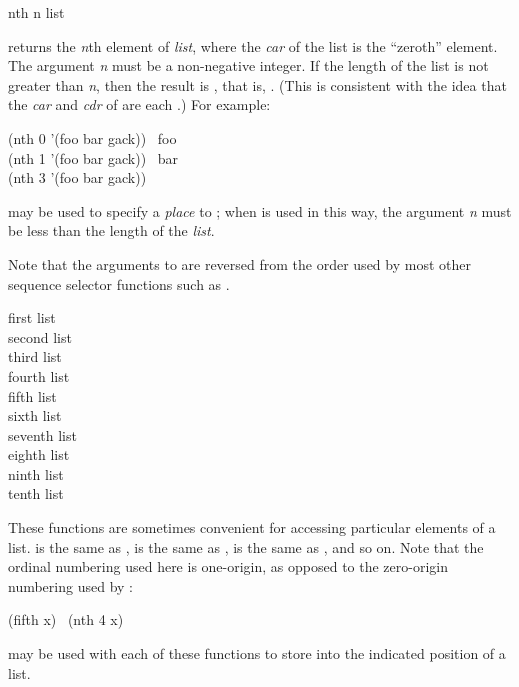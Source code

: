 \begin{defun}[Function]
nth n list

 returns the \emph{n}th element of \emph{list}, where
the \emph{car} of the list is the ``zeroth'' element.
The argument \emph{n} must be a non-negative integer.
If the length of the list is not greater than \emph{n}, then the result
is {\emptylist}, that is, {\false}.
(This is consistent with the idea that the \emph{car} and \emph{cdr}
of {\emptylist} are each {\emptylist}.)
For example:
\begin{lisp}
(nth 0 '(foo bar gack)) \EV\ foo \\
(nth 1 '(foo bar gack)) \EV\ bar \\
(nth 3 '(foo bar gack)) \EV\ {\emptylist}
\end{lisp}

 may be used to specify a \emph{place} to ;
when  is used in this way, the argument \emph{n} must be less
than the length of the \emph{list}.

Note that the arguments to  are reversed from the order
used by most other sequence selector functions such as .
\end{defun}


\begin{defun}[Function]
first list \\
second list \\
third list \\
fourth list \\
fifth list \\
sixth list \\
seventh list \\
eighth list \\
ninth list \\
tenth list

These functions are sometimes convenient for accessing particular
elements of a list.   is the same as ,
 is the same as ,  is the
same as , and so on.
Note that the ordinal numbering used here is one-origin,
as opposed to the zero-origin numbering used by :
\begin{lisp}
(fifth x) \EQ\ (nth 4 x)
\end{lisp}

 may be used with each of these functions to store
into the indicated position of a list.
\end{defun}

